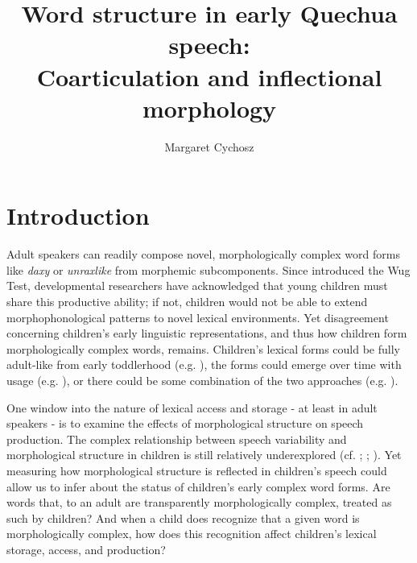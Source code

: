 \documentclass[a4paper,man,floatsintext,natbib,donotrepeattitle, apacite]{apa6}
\title{\LARGE Word structure in early Quechua speech: \\ Coarticulation and inflectional morphology}
\author[a]{\large Margaret Cychosz}
\affil[a]{\small University of California, Berkeley, Department of Linguistics, 1203 Dwinelle Hall, Berkeley, USA, \url{mcychosz@berkeley.edu}}
\affiliation{} %
\begin{document}
\justifying
\setlength\parindent{24pt} %

\maketitle

\setcounter{secnumdepth}{2} %


\section{Introduction}

Adult speakers can readily compose novel, morphologically complex word forms like \textit{daxy} or \textit{unraxlike} from morphemic subcomponents. Since \citet{berkoChildLearningEnglish1958} introduced the Wug Test, developmental researchers have acknowledged that young children must share this productive ability; if not, children would not be able to extend morphophonological patterns to novel lexical environments. Yet disagreement concerning children’s early linguistic representations, and thus how children form morphologically complex words, remains. Children's lexical forms could be fully adult-like from early toddlerhood (e.g. \citealt{wexlerVeryEarlyParameter1998}), the forms could emerge over time with usage (e.g. \citealt{ambridgeUbiquityFrequencyEffects2015}), or there could be some combination of the two approaches (e.g. \citealt{swingleyLexicalNeighborhoodsWordForm2002}). 

One window into the nature of lexical access and storage - at least in adult speakers - is to examine the effects of morphological structure on speech production. The complex relationship between speech variability and morphological structure in children is still relatively underexplored (cf. \citealt{redfordGrammaticalWordProduction2018}; \citealt{songEffectsCoarticulationMorphological2013}; \citealt{songDurationalCuesFricative2013}). Yet measuring how morphological structure is reflected in children's speech could allow us to infer about the status of children's early complex word forms. Are words that, to an adult are transparently morphologically complex, treated as such by children? And when a child does recognize that a given word is morphologically complex, how does this recognition affect children's lexical storage, access, and production? 
\end{document}
